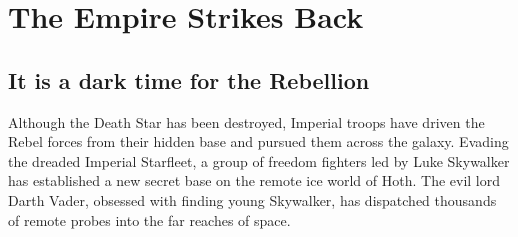 \chapter{The Empire Strikes Back}
\section{It is a dark time for the Rebellion}
 
Although the Death Star has been destroyed, Imperial troops 
have driven the Rebel forces from their hidden base and 
pursued them across the galaxy.  Evading the dreaded 
Imperial Starfleet, a group of freedom fighters led by Luke 
Skywalker has established a new secret base on the remote 
ice world of Hoth.  The evil lord Darth Vader, obsessed with 
finding young Skywalker, has dispatched thousands of remote 
probes into the far reaches of space.

\lipsum[1-10]
\cite{THEWS_2001}
\cite{FLORKOWSKI_2010}
\cite{GROSS_1973}
